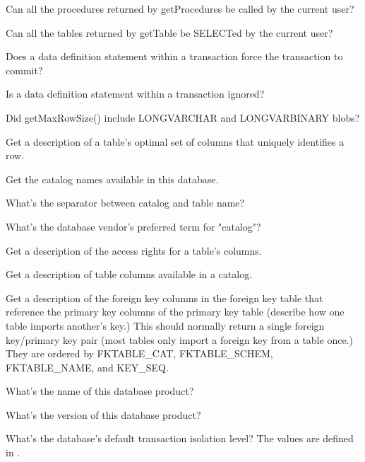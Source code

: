 \begin{description}
Can all the procedures returned by getProcedures be called by the current user? 

Can all the tables returned by getTable be SELECTed by the current user? 

Does a data definition statement within a transaction force the transaction to commit? 

Is a data definition statement within a transaction ignored? 

Did getMaxRowSize() include LONGVARCHAR and LONGVARBINARY blobs? 

Get a description of a table's optimal set of columns that uniquely identifies a row. 

Get the catalog names available in this database. 

What's the separator between catalog and table name? 

What's the database vendor's preferred term for "catalog"? 

Get a description of the access rights for a table's columns. 

Get a description of table columns available in a catalog. 

Get a description of the foreign key columns in the foreign key table that reference the primary key columns of the primary key table (describe how one table imports another's key.) This should normally return a single foreign key/primary key pair (most tables only import a foreign key from a table once.) They are ordered by FKTABLE\_CAT, FKTABLE\_SCHEM, FKTABLE\_NAME, and KEY\_SEQ. 

What's the name of this database product? 

What's the version of this database product? 

What's the database's default transaction isolation level? The values are defined in . 


\end{description}
